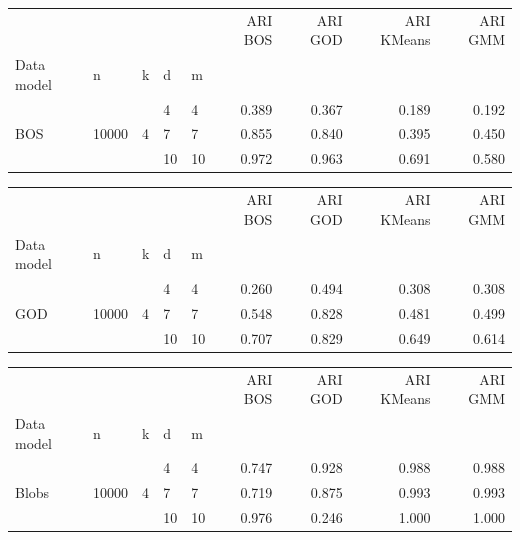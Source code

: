 \begin{table}[H]
    \begin{minipage}{.48\columnwidth}
    \begin{adjustbox}{width=\columnwidth}
    \begin{tabular}{lllllrrrr}
     &  &  &  &  & ARI BOS & ARI GOD & ARI KMeans & ARI GMM \\
    Data model & n & k & d & m &  &  &  &  \\
    \cline{1-9}
    \multirow[t]{3}{*}{BOS} & \multirow[t]{3}{*}{10000} & \multirow[t]{3}{*}{4} & 4 & 4 & 0.389 & 0.367 & 0.189 & 0.192 \\
    \cline{4-9}
     &  &  & 7 & 7 & 0.855 & 0.840 & 0.395 & 0.450 \\
    \cline{4-9}
     &  &  & 10 & 10 & 0.972 & 0.963 & 0.691 & 0.580 \\
    \end{tabular}
    \end{adjustbox}
    \end{minipage} \hspace{.02\columnwidth}%
    \begin{minipage}{.48\columnwidth}
    \begin{adjustbox}{width=\columnwidth}
    \begin{tabular}{lllllrrrr}
     &  &  &  &  & ARI BOS & ARI GOD & ARI KMeans & ARI GMM \\
    Data model & n & k & d & m &  &  &  &  \\
    \cline{1-9}
    \multirow[t]{3}{*}{GOD} & \multirow[t]{3}{*}{10000} & \multirow[t]{3}{*}{4} & 4 & 4 & 0.260 & 0.494 & 0.308 & 0.308 \\
    \cline{4-9}
     &  &  & 7 & 7 & 0.548 & 0.828 & 0.481 & 0.499 \\
    \cline{4-9}
     &  &  & 10 & 10 & 0.707 & 0.829 & 0.649 & 0.614 \\
    \end{tabular}
    \end{adjustbox}
    \end{minipage}

    \begin{minipage}{\textwidth}
    \centering
    \begin{adjustbox}{width=.48\textwidth, center}
    \begin{tabular}{lllllrrrr}
     &  &  &  &  & ARI BOS & ARI GOD & ARI KMeans & ARI GMM \\
    Data model & n & k & d & m &  &  &  &  \\
    \cline{1-9}
    \multirow[t]{3}{*}{Blobs} & \multirow[t]{3}{*}{10000} & \multirow[t]{3}{*}{4} & 4 & 4 & 0.747 & 0.928 & 0.988 & 0.988 \\
    \cline{4-9}
     &  &  & 7 & 7 & 0.719 & 0.875 & 0.993 & 0.993 \\
    \cline{4-9}
     &  &  & 10 & 10 & 0.976 & 0.246 & 1.000 & 1.000 \\
    \end{tabular}
    \end{adjustbox}
    \end{minipage}


\end{table}
